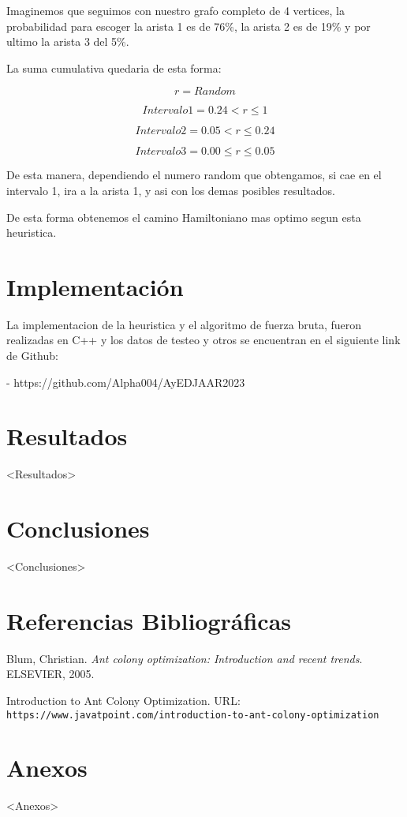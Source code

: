 \documentclass{article}
\begin{document}
Imaginemos que seguimos con nuestro grafo completo de 4 vertices, la probabilidad para escoger la arista 1 es de 76\%, la arista 2 es de 19\% y por ultimo
la arista 3 del 5\%.

La suma cumulativa quedaria de esta forma:

    $$\textit{r} = Random$$

    $$Intervalo 1 = {0.24 < \textit{r} \leq 1 }$$

    $$Intervalo 2 = {0.05 < \textit{r} \leq 0.24 }$$

    $$Intervalo 3 = {0.00 \leq \textit{r} \leq 0.05 }$$

De esta manera, dependiendo el numero random que obtengamos, si cae en el intervalo 1, ira a la arista 1, y asi con los demas posibles resultados.

De esta forma obtenemos el camino Hamiltoniano mas optimo segun esta heuristica.

\section{Implementación}
La implementacion de la heuristica y el algoritmo de fuerza bruta, fueron realizadas en C++ y los datos de testeo y otros
se encuentran en el siguiente link de Github:
 
- https://github.com/Alpha004/AyEDJAAR2023

\section{Resultados}
<Resultados>

\section{Conclusiones}
<Conclusiones>

\section{Referencias Bibliográficas}
\begin{thebibliography}{9}
Blum, Christian. \textit{Ant colony optimization: Introduction and recent trends}. ELSEVIER, 2005.

Introduction to Ant Colony Optimization. URL: \texttt{https://www.javatpoint.com/introduction-to-ant-colony-optimization}

\end{thebibliography}

\section{Anexos}
<Anexos>
\end{document}
